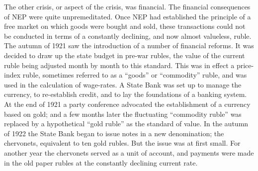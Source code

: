 The other crisis, or aspect of the crisis, was financial. The financial consequences of NEP were quite unpremeditated. Once NEP had established the principle of a free market on which goods were bought and sold, these transactions could not be conducted in terms of a constantly declining, and now almost valueless, ruble. The autumn of 1921 saw the introduction of a number of financial reforms. It was decided to draw up the state budget in pre-war rubles, the value of the current ruble being adjusted month by month to this standard. This was in effect a price-index ruble, sometimes referred to as a ``goods'' or ``commodity'' ruble, and was used in the calculation of wage-rates. A State Bank was set up to manage the currency, to re-establish credit, and to lay the foundations of a banking system. At the end of 1921 a party conference advocated the establishment of a currency based on gold; and a few months later the fluctuating ``commodity ruble'' was replaced by a hypothetical ``gold ruble'' as the standard of value. In the autumn of 1922 the State Bank began to issue notes in a new denomination; the chervonets, equivalent to ten gold rubles. But the issue was at first small. For another year the chervonets served as a unit of account, and payments were made in the old paper rubles at the constantly declining current rate. 


